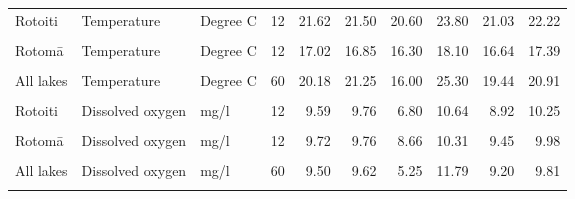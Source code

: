 \documentclass[
  12pt,
  a4paper,
  oneside]{scrbook}
\begin{document}
\begin{longtable}[t]{lllrrrrrrr}
Rotoiti & Temperature & Degree C & 12 & 21.62 & 21.50 & 20.60 & 23.80 & 21.03 & 22.22\\
\cellcolor{gray!8}{Rotoehu} & \cellcolor{gray!8}{Temperature} & \cellcolor{gray!8}{Degree C} & \cellcolor{gray!8}{12} & \cellcolor{gray!8}{22.11} & \cellcolor{gray!8}{22.05} & \cellcolor{gray!8}{21.20} & \cellcolor{gray!8}{23.00} & \cellcolor{gray!8}{21.72} & \cellcolor{gray!8}{22.49}\\
\addlinespace
Rotomā & Temperature & Degree C & 12 & 17.02 & 16.85 & 16.30 & 18.10 & 16.64 & 17.39\\
\cellcolor{gray!8}{Ōkāreka} & \cellcolor{gray!8}{Temperature} & \cellcolor{gray!8}{Degree C} & \cellcolor{gray!8}{12} & \cellcolor{gray!8}{16.98} & \cellcolor{gray!8}{16.30} & \cellcolor{gray!8}{16.00} & \cellcolor{gray!8}{20.70} & \cellcolor{gray!8}{15.93} & \cellcolor{gray!8}{18.04}\\
All lakes & Temperature & Degree C & 60 & 20.18 & 21.25 & 16.00 & 25.30 & 19.44 & 20.91\\
\cellcolor{gray!8}{Rotorua} & \cellcolor{gray!8}{Dissolved oxygen} & \cellcolor{gray!8}{mg/l} & \cellcolor{gray!8}{12} & \cellcolor{gray!8}{8.49} & \cellcolor{gray!8}{7.92} & \cellcolor{gray!8}{5.25} & \cellcolor{gray!8}{11.05} & \cellcolor{gray!8}{7.39} & \cellcolor{gray!8}{9.59}\\
Rotoiti & Dissolved oxygen & mg/l & 12 & 9.59 & 9.76 & 6.80 & 10.64 & 8.92 & 10.25\\
\addlinespace
\cellcolor{gray!8}{Rotoehu} & \cellcolor{gray!8}{Dissolved oxygen} & \cellcolor{gray!8}{mg/l} & \cellcolor{gray!8}{12} & \cellcolor{gray!8}{10.36} & \cellcolor{gray!8}{10.77} & \cellcolor{gray!8}{8.85} & \cellcolor{gray!8}{11.79} & \cellcolor{gray!8}{9.67} & \cellcolor{gray!8}{11.05}\\
Rotomā & Dissolved oxygen & mg/l & 12 & 9.72 & 9.76 & 8.66 & 10.31 & 9.45 & 9.98\\
\cellcolor{gray!8}{Ōkāreka} & \cellcolor{gray!8}{Dissolved oxygen} & \cellcolor{gray!8}{mg/l} & \cellcolor{gray!8}{12} & \cellcolor{gray!8}{9.37} & \cellcolor{gray!8}{9.38} & \cellcolor{gray!8}{8.83} & \cellcolor{gray!8}{9.74} & \cellcolor{gray!8}{9.20} & \cellcolor{gray!8}{9.53}\\
All lakes & Dissolved oxygen & mg/l & 60 & 9.50 & 9.62 & 5.25 & 11.79 & 9.20 & 9.81\\
\cellcolor{gray!8}{Rotorua} & \cellcolor{gray!8}{Specific conductivity} & \cellcolor{gray!8}{µS/cm} & \cellcolor{gray!8}{12} & \cellcolor{gray!8}{205.36} & \cellcolor{gray!8}{188.27} & \cellcolor{gray!8}{156.20} & \cellcolor{gray!8}{443.01} & \cellcolor{gray!8}{156.39} & \cellcolor{gray!8}{254.33}\\

\end{longtable}
\end{document}
